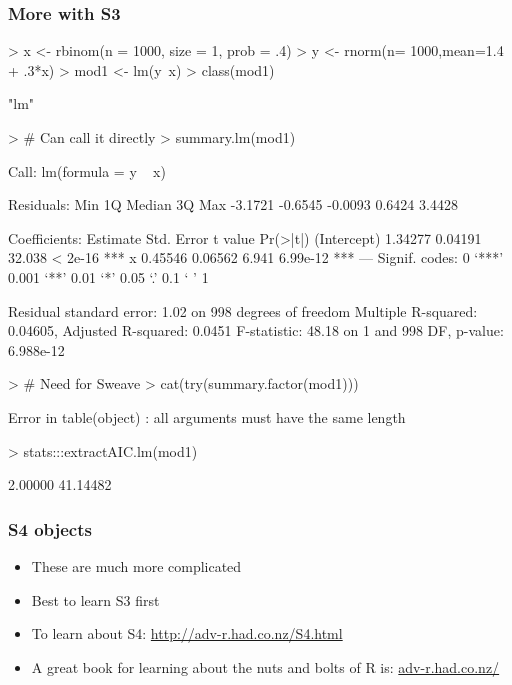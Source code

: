 \documentclass[xcolor=svgnames]{beamer}
\begin{document}
\begin{frame}[fragile]
  \frametitle{More with S3}
\begin{tiny}
\begin{Schunk}
\begin{Sinput}
> x <- rbinom(n = 1000, size = 1, prob = .4)
> y <- rnorm(n= 1000,mean=1.4 + .3*x)
> mod1 <- lm(y~x)
> class(mod1)
\end{Sinput}
\begin{Soutput}
[1] "lm"
\end{Soutput}
\begin{Sinput}
> # Can call it directly
> summary.lm(mod1)
\end{Sinput}
\begin{Soutput}
Call:
lm(formula = y ~ x)

Residuals:
    Min      1Q  Median      3Q     Max 
-3.1721 -0.6545 -0.0093  0.6424  3.4428 

Coefficients:
            Estimate Std. Error t value Pr(>|t|)    
(Intercept)  1.34277    0.04191  32.038  < 2e-16 ***
x            0.45546    0.06562   6.941 6.99e-12 ***
---
Signif. codes:  0 ‘***’ 0.001 ‘**’ 0.01 ‘*’ 0.05 ‘.’ 0.1 ‘ ’ 1

Residual standard error: 1.02 on 998 degrees of freedom
Multiple R-squared:  0.04605,	Adjusted R-squared:  0.0451 
F-statistic: 48.18 on 1 and 998 DF,  p-value: 6.988e-12
\end{Soutput}
\begin{Sinput}
> # Need for Sweave
> cat(try(summary.factor(mod1)))
\end{Sinput}
\begin{Soutput}
Error in table(object) : all arguments must have the same length
\end{Soutput}
\begin{Sinput}
> stats:::extractAIC.lm(mod1)
\end{Sinput}
\begin{Soutput}
[1]  2.00000 41.14482
\end{Soutput}
\end{Schunk}
\end{tiny}
\end{frame}

\begin{frame}
  \frametitle{S4 objects}
  \begin{itemize}
    \item These are much more complicated
      \item Best to learn S3 first
        \item To learn about S4: \url{http://adv-r.had.co.nz/S4.html}
          \item A great book for learning about the nuts and bolts of R is: \url{adv-r.had.co.nz/}
      
  \end{itemize}
\end{frame}
\end{document}
